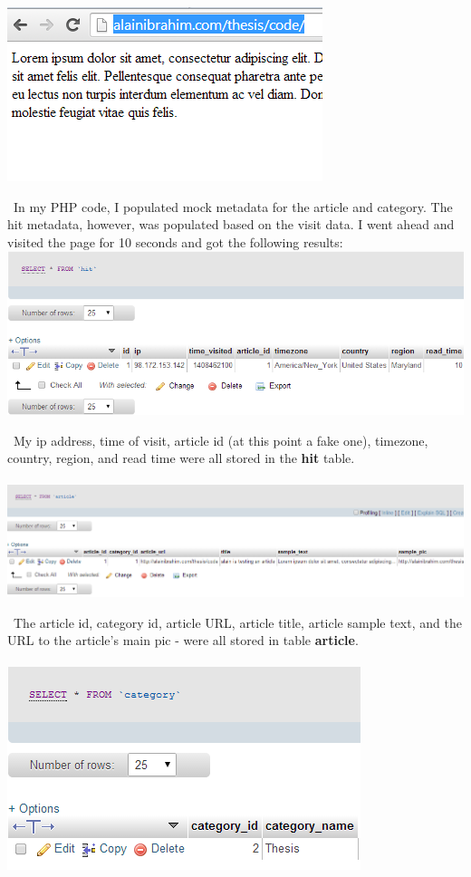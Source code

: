 \documentclass[12pt]{article}
\begin{document}
\noindent\includegraphics[scale=1]{img/visit1}

\noindent\ In my PHP code, I populated mock metadata for the article and category. The hit metadata, however, was populated based on the visit data. I went ahead and visited the page for 10 seconds and got the following results:\\

\noindent\includegraphics[scale=0.6]{img/visit2}

\noindent\ My ip address, time of visit, article id (at this point a fake one), timezone, country, region, and read time were all stored in the \textbf{hit} table.\\ \\

\noindent\includegraphics[scale=0.5]{img/visit3}

\noindent\ The article id, category id, article URL, article title, article sample text, and the URL to the article's main pic - were all stored in table \textbf{article}. \\ \\

\noindent\includegraphics[scale=0.7]{img/visit4}
\end{document}
